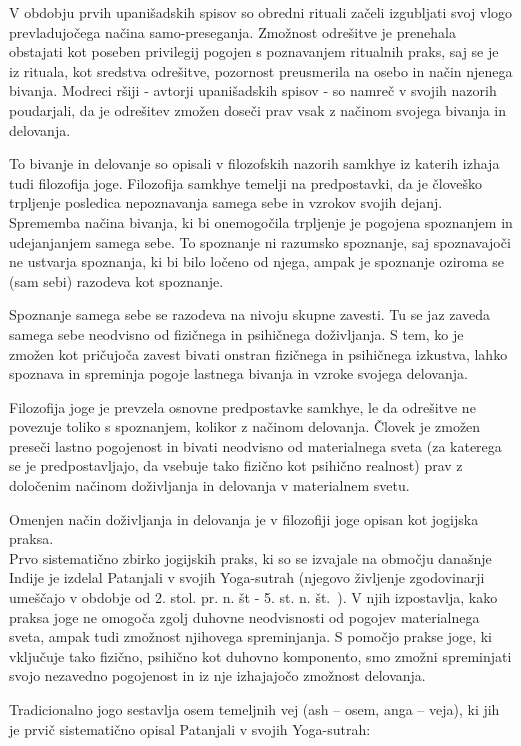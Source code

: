 \documentclass[a4paper, 12pt]{book}
\begin{document}
V obdobju prvih upanišadskih spisov so obredni rituali začeli izgubljati svoj vlogo prevladujočega načina samo-preseganja. Zmožnost odrešitve je prenehala obstajati kot poseben privilegij pogojen s poznavanjem ritualnih praks, saj se je iz rituala, kot sredstva odrešitve, pozornost preusmerila na osebo in način njenega bivanja. Modreci ršiji - avtorji upanišadskih spisov - so namreč v svojih nazorih poudarjali, da je odrešitev zmožen doseči prav vsak z načinom svojega bivanja in delovanja.

To bivanje in delovanje so opisali v filozofskih nazorih samkhye iz katerih izhaja tudi filozofija joge. Filozofija samkhye temelji na predpostavki, da je človeško trpljenje posledica nepoznavanja samega sebe in vzrokov svojih dejanj. Sprememba načina bivanja, ki bi onemogočila trpljenje je pogojena spoznanjem in udejanjanjem samega sebe. To spoznanje ni razumsko spoznanje, saj spoznavajoči ne ustvarja spoznanja, ki bi bilo ločeno od njega, ampak je spoznanje oziroma se (sam sebi) razodeva kot spoznanje.

Spoznanje samega sebe se razodeva na nivoju skupne zavesti. Tu se jaz zaveda samega sebe neodvisno od fizičnega in psihičnega doživljanja. S tem, ko je zmožen kot pričujoča zavest bivati onstran fizičnega in psihičnega izkustva, lahko spoznava in spreminja pogoje lastnega bivanja in vzroke svojega delovanja.

Filozofija joge je prevzela osnovne predpostavke samkhye, le da odrešitve ne povezuje toliko s spoznanjem, kolikor z načinom delovanja. Človek je zmožen preseči lastno pogojenost in bivati neodvisno od materialnega sveta (za katerega se je predpostavljajo, da vsebuje tako fizično kot psihično realnost) prav z določenim načinom doživljanja in delovanja v materialnem svetu.

Omenjen način doživljanja in delovanja je v filozofiji joge opisan kot jogijska praksa. \\ 
Prvo sistematično zbirko jogijskih praks, ki so se izvajale na območju današnje Indije je izdelal Patanjali v svojih Yoga-sutrah (njegovo življenje zgodovinarji umeščajo v obdobje od 2. stol. pr. n. št - 5. st. n. št.~\cite{ZgodovinaJoge}). V njih izpostavlja, kako praksa joge ne omogoča zgolj duhovne neodvisnosti od pogojev materialnega sveta, ampak tudi zmožnost njihovega spreminjanja. S pomočjo prakse joge, ki vključuje tako fizično, psihično kot duhovno komponento, smo zmožni spreminjati svojo nezavedno pogojenost in iz nje izhajajočo zmožnost delovanja.

Tradicionalno jogo sestavlja osem temeljnih vej (ash – osem, anga – veja), ki jih je prvič sistematično opisal Patanjali v svojih Yoga-sutrah:
\end{document}
